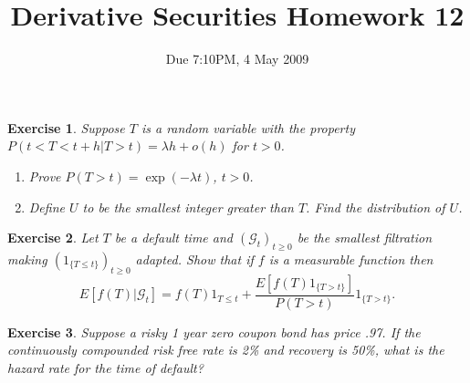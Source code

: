 \documentclass[11pt,fleqn]{amsproc}
\newcommand{\G}{\mathcal{G}}
\newtheorem{xca}{Exercise}
\begin{document}
\title{Derivative Securities Homework 12}
\author{Due 7:10PM, 4 May 2009}

\maketitle

\begin{xca}
Suppose $T$ is a random variable with the property $P(t < T < t + h|T>t) = \lambda h + o(h)$ for $t > 0$.
\begin{enumerate}
\item Prove $P(T > t) = \exp(-\lambda t)$, $t > 0$.
\item Define $U$ to be the smallest integer greater than $T$. Find the distribution of $U$.
\end{enumerate}
\end{xca}

\begin{xca}
Let $T$ be a default time and $(\G_t)_{t\ge0}$ be the smallest filtration making $(1_{\{T\le t\}})_{t\ge0}$ adapted.
Show that if $f$ is a measurable function then 
\begin{equation*}
E[f(T)|\G_t] = f(T)1_{T\le t} + \frac{E[f(T)1_{\{T > t\}}]}{P(T > t)} 1_{\{T > t\}}.
\end{equation*}
\end{xca}

\begin{xca}
Suppose a risky 1 year zero coupon bond has price .97. If the continuously compounded risk free rate is 2\% 
and recovery is 50\%, what is the hazard rate for the time of default?
\end{xca}
\end{document}
